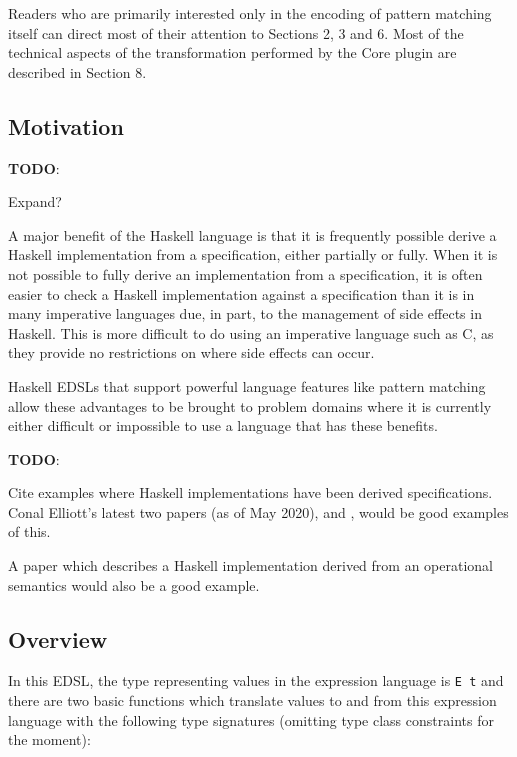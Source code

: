 \documentclass[sigplan,anonymous,review]{acmart}
\newcommand{\ttt}{\texttt}
\newenvironment{todo}
  {\begin{tcolorbox}
   \textbf{TODO}:
  }
  {\end{tcolorbox}
  }
\begin{document}
Readers who are primarily interested only in the encoding of pattern matching itself can direct
most of their attention to Sections 2, 3 and 6. Most of the technical aspects of
the transformation performed by the Core plugin are described in Section 8.

\subsection{Motivation}

\begin{todo}
  Expand?
\end{todo}

A major benefit of the Haskell language is that it is frequently possible derive
a Haskell implementation from a specification, either partially or fully. When
it is not possible to fully derive an implementation from a specification, it is
often easier to check a Haskell implementation against a specification than it
is in many imperative languages due, in part, to the management of side effects
in Haskell. This is more difficult to do using an imperative language such as C,
as they provide no restrictions on where side effects can occur.

Haskell EDSLs that support powerful language features like pattern matching
allow these advantages to be brought to problem domains where it is currently
either difficult or impossible to use a language that has these benefits.

\begin{todo}
  Cite examples where Haskell implementations have been derived specifications.
  Conal Elliott's latest two papers (as of May 2020),
  \cite{Elliott-2018-ad-icfp} and \cite{Elliott2019-convolution-extended}, would
  be good examples of this.

  A paper which describes a Haskell implementation derived from an operational
  semantics would also be a good example.
\end{todo}

\subsection{Overview}
\label{sec:Overview}

In this EDSL, the type representing values in the expression language is \ttt{E
t} and there are two basic functions which translate values to and from this
expression language with the following type signatures (omitting type class
constraints for the moment):
\end{document}
